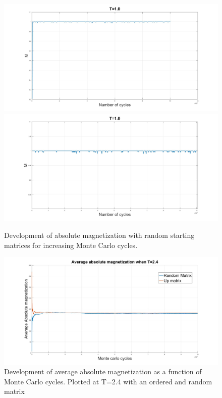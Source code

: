 \documentclass[10pt,a4paper]{article}
\begin{document}
\begin{figure} [H]
\centerline{
\includegraphics[scale=0.15]{RANDOMmag1abs.jpg}
\includegraphics[scale=0.15]{UPmag1abs.jpg}
}
\caption{Development of absolute magnetization with random starting matrices for increasing Monte Carlo cycles.}
\label{fig:RandomMagAbs}
\end{figure}


\begin{figure} [H]
\centerline{
\includegraphics[scale=0.3]{avgMagn24.jpg}
}
\caption{Development of average absolute magnetization as a function of Monte Carlo cycles. Plotted at T=2.4 with an ordered and random matrix}
\label{fig:AverageMagn24}
\end{figure}
\end{document}
